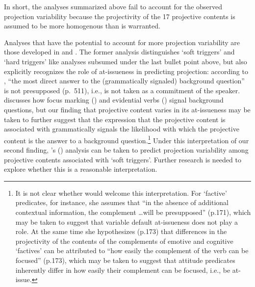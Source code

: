 \documentclass[11pt,fleqn]{article}
\newcommand{\6}{\mbox{$[\hspace*{-.6mm}[$}}
\newcommand{\9}{\mbox{$]\hspace*{-.6mm}]$}}
\newcommand{\citetpos}[1]{\citeauthor{#1}'s (\citeyear{#1})}
\begin{document}
In short, the analyses summarized above fail to account for the observed projection variability because the projectivity of the 17 projective contents is assumed to be more homogenous than is warranted. 

Analyses that have the potential to account for more projection variability are those developed in \citealt{abrusan2011} and \citealt{abrusan2016}. The former analysis distinguishes `soft triggers' and `hard triggers' like analyses subsumed under the last bullet point above, but also explicitly recognizes the role of at-issueness in predicting projection: according to \citealt{abrusan2011}, ``the most direct answer to the (grammatically signaled) background question'' is not presupposed (p.\ 511), i.e., is not taken as a commitment of the speaker.  \citet{abrusan2011} discusses how focus marking (\citealt{beaver-belly}) and evidential verbs (\citealt{simons07}) signal background questions, but our finding that projective content varies in its at-issueness may be taken to further suggest that the expression that the projective content is associated with grammatically signals the likelihood with which the projective content is the answer to a background question.\footnote{It is not clear whether \citet{abrusan2016} would welcome this interpretation. For `factive' predicates, for instance, she assumes that ``in the absence of additional contextual information, the complement \ldots will be presupposed'' (p.171), which may be taken to suggest that variable default at-issueness does not play a role. At the same time she hypothesizes (p.173) that differences in the projectivity of the contents of the complements of emotive and cognitive `factives' can be attributed to ``how easily the complement of the verb can be focused'' (p.173), which may be taken to suggest that attitude predicates inherently differ in how easily their complement can be focused, i.e., be at-issue.} Under this interpretation of our second finding, \citetpos{abrusan2011} analysis can be taken to predict projection variability among projective contents associated with `soft triggers'. Further research is needed to explore whether this is a reasonable interpretation.
\end{document}
